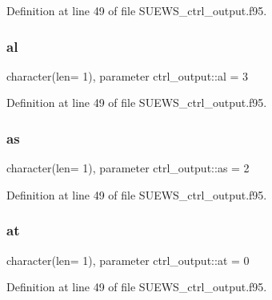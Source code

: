 Definition at line 49 of file S\+U\+E\+W\+S\+\_\+ctrl\+\_\+output.\+f95.

\mbox{\label{namespacectrl__output_a0cab13c6b1b664657d53f54bcaaf0b93}} 
\subsubsection{\texorpdfstring{al}{al}}
{\footnotesize\ttfamily character(len= 1), parameter ctrl\+\_\+output\+::al = \textquotesingle{}3\textquotesingle{}}



Definition at line 49 of file S\+U\+E\+W\+S\+\_\+ctrl\+\_\+output.\+f95.

\mbox{\label{namespacectrl__output_a27bc52c96e692d0dbe7f6f73a3aea7e7}} 
\subsubsection{\texorpdfstring{as}{as}}
{\footnotesize\ttfamily character(len= 1), parameter ctrl\+\_\+output\+::as = \textquotesingle{}2\textquotesingle{}}



Definition at line 49 of file S\+U\+E\+W\+S\+\_\+ctrl\+\_\+output.\+f95.

\mbox{\label{namespacectrl__output_a18321fc13d7efb9b006ac70cece45909}} 
\subsubsection{\texorpdfstring{at}{at}}
{\footnotesize\ttfamily character(len= 1), parameter ctrl\+\_\+output\+::at = \textquotesingle{}0\textquotesingle{}}



Definition at line 49 of file S\+U\+E\+W\+S\+\_\+ctrl\+\_\+output.\+f95.

\mbox{\label{namespacectrl__output_a8653fec4faca8b39551da13d93a3f223}} 
